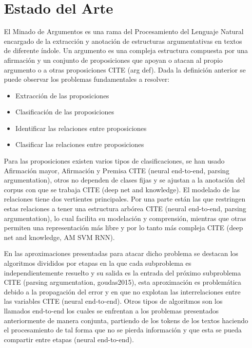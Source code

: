 \chapter{Estado del Arte}\label{chapter:state-of-the-art}

El Minado de Argumentos es una rama del Procesamiento del Lenguaje Natural encargado 
de la extracción y anotación de estructuras argumentativas en textos de diferente índole.
Un argumento es una compleja estructura compuesta por una afirmación y un conjunto de proposiciones
que apoyan o atacan al propio argumento o a otras proposiciones CITE (arg def). Dada la definición
anterior se puede observar los problemas fundamentales a resolver:

\begin{itemize}
    \item Extracción de las proposiciones
    \item Clasificación de las proposiciones
    \item Identificar las relaciones entre proposiciones
    \item Clasificar las relaciones entre proposiciones
\end{itemize}

Para las proposiciones existen varios tipos de clasificaciones, se han usado Afirmación mayor, Afirmación y 
Premisa CITE (neural end-to-end, parsing argumentation), otros no dependen de clases fijas y se ajustan 
a la anotación del corpus con que se trabaja CITE (deep net and knowledge). El modelado de las relaciones
tiene dos vertientes principales. Por una parte están las que restringen estas relaciones a tener una
estructura arbórea CITE (neural end-to-end, parsing argumentation), lo cual facilita su modelación y 
comprensión, mientras que otras permiten una representación más libre y por lo tanto más compleja 
CITE (deep net and knowledge, AM SVM RNN).

En las aproximaciones presentadas para atacar dicho problema se destacan los algoritmos divididos
por etapas en la que cada subproblema es independientemente resuelto y su salida es la entrada del
próximo subproblema CITE (parsing argumentation, goudas2015), esta aproximación es problemática debido a la propagación del error y en que no 
explotan las interrelaciones entre las variables CITE (neural end-to-end). Otros tipos de algoritmos son
los llamados end-to-end los cuales se enfrentan a los problemas presentados anteriormente de manera
conjunta, partiendo de los tokens de los textos haciendo el procesamiento de tal forma que no se pierda
información y que esta se pueda compartir entre etapas (neural end-to-end).

